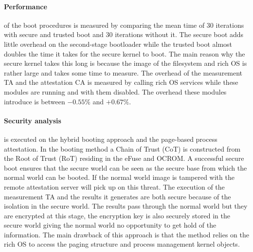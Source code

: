 \documentclass{report}
\begin{document}
\paragraph*{Performance}
of the boot procedures is measured by comparing the mean time of 30 iterations with secure and trusted boot and 30 iterations without it. The secure boot adds little overhead on the second-stage bootloader while the trusted boot almost doubles the time it takes for the secure kernel to boot. The main reason why the secure kernel takes this long is because the image of the filesystem and rich OS is rather large and takes some time to measure. The overhead of the measurement TA and the attestation CA is measured by calling rich OS services while these modules are running and with them disabled. The overhead these modules introduce is between $-0.55\%$ and $+0.67\%$.

\paragraph*{Security analysis}
is executed on the hybrid booting approach and the page-based process attestation. In the booting method a Chain of Trust (CoT) is constructed from the Root of Trust (RoT) residing in the eFuse and OCROM. A successful secure boot ensures that the secure world can be seen as the secure base from which the normal world can be booted. If the normal world image is tampered with the remote attestation server will pick up on this threat. The execution of the measurement TA and the results it generates are both secure because of the isolation in the secure world. The results pass through the normal world but they are encrypted at this stage, the encryption key is also securely stored in the secure world giving the normal world no opportunity to get hold of the information. The main drawback of this approach is that the method relies on the rich OS to access the paging structure and process management kernel objects.
\end{document}
